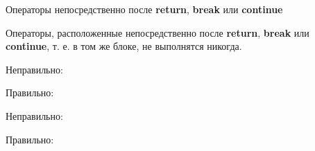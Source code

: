 \begin{typerror}
	\label{TE_operators-after-return-break-continue}
	Операторы непосредственно после \textbf{return}, \textbf{break} или \textbf{continue}

	Операторы, расположенные непосредственно после \textbf{return}, \textbf{break} или \textbf{continue}, т. е. в том же блоке, не выполнятся никогда.

	Неправильно:

	Правильно:

	Неправильно:

	Правильно:

\end  {typerror}
